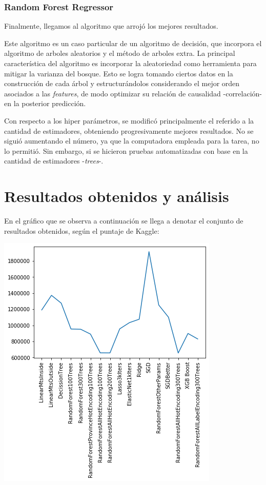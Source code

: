 \documentclass[titlepage,a4paper,11pt]{article}
\makeatletter
\def\maxwidth{\ifdim\Gin@nat@width>\linewidth\linewidth
    \else\Gin@nat@width\fi}
\let\Oldincludegraphics\includegraphics
\renewcommand{\includegraphics}[1]{\Oldincludegraphics[width=\maxwidth]{#1}}
\makeatother
\begin{document}
\subsubsection{Random Forest Regressor}
Finalmente, llegamos al algoritmo que arrojó los mejores resultados.

Este algoritmo es un caso particular de un algoritmo de decisión, que incorpora el algoritmo de arboles aleatorios y el método de arboles extra. La principal característica del algoritmo es incorporar la aleatoriedad como herramienta para mitigar la varianza del bosque. Esto se logra tomando ciertos datos en la construcción de cada árbol y estructurándolos considerando el mejor orden asociados a las \textit{features}, de modo optimizar su relación de causalidad -correlación- en la posterior predicción.

Con respecto a los hiper parámetros, se modificó principalmente el referido a la cantidad de estimadores, obteniendo progresivamente mejores resultados. No se siguió aumentando el número, ya que la computadora empleada para la tarea, no lo permitió. Sin embargo, si se hicieron pruebas automatizadas con base en la cantidad de estimadores -\textit{trees}-.

\pagebreak

\section{Resultados obtenidos y análisis}
En el gráfico que se observa a continuación se llega a denotar el conjunto de resultados obtenidos, según el puntaje de Kaggle:

\includegraphics{Comparativa.png}
\end{document}
